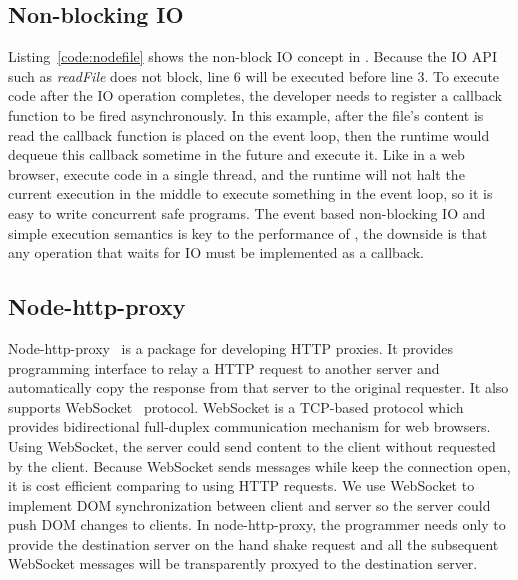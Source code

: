 \subsection{Non-blocking IO}


Listing~\ref{code:nodefile} shows the non-block IO concept in \nodejs.
Because the IO API such as \emph{readFile} does not
block, line 6 will be executed before line 3.
To execute code after the IO operation completes,
the developer needs to register a callback function to be fired asynchronously.
In this example, after the file's content is read the callback function is placed on the
event loop,
then the runtime would dequeue this callback sometime in the future and execute it.
Like in a web browser, \nodejs execute \js code in a single thread,
and the runtime will not halt the current execution in the middle to execute something in
the event loop, so it is easy to write concurrent safe programs.
The event based non-blocking IO and simple execution semantics
is key to the performance of \nodejs,
the downside is that any operation that waits for IO must be implemented as a callback.

\subsection{Node-http-proxy}

Node-http-proxy~\cite{nodeproxy} is a \nodejs package for developing HTTP proxies.
It provides programming interface to relay a HTTP request to another server and
automatically copy the response from that server to the original requester.
It also supports WebSocket~\cite{rfc6455} protocol.
WebSocket is a TCP-based protocol which provides bidirectional full-duplex communication
mechanism for web browsers.
Using WebSocket, the server could send content to the client without requested
by the client.
Because WebSocket sends messages while keep the connection open,
it is cost efficient comparing to using HTTP requests.
We use WebSocket to implement DOM synchronization between client and server so
the server could push DOM changes to clients.
In node-http-proxy,
the programmer needs only to provide the destination server on the hand shake
request and all the subsequent WebSocket messages will
be transparently proxyed to the destination server.

